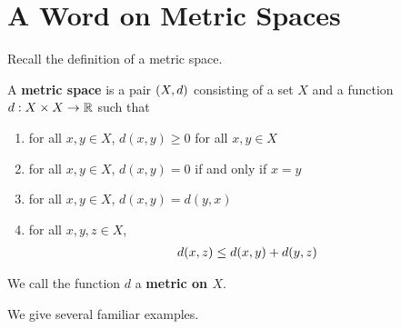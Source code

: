 \section{A Word on Metric Spaces}

Recall the definition of a metric space.

\begin{boxdefinition}
    A \textbf{metric space} is a pair $\left( X, d \right)$ consisting of a set $X$ and a function $d : X \times X \to \mathbb{R}$ such that
    \begin{enumerate}
        \item for all $x, y \in X$, $d(x, y) \geq 0$ for all $x, y \in X$
        \item for all $x, y \in X$, $d(x, y) = 0$ if and only if $x = y$
        \item for all $x, y \in X$, $d(x, y) = d(y, x)$
        \item for all $x, y, z \in X$,
        \begin{align*}
            d\!\left( x, z \right) \leq d\!\left( x, y \right) + d\!\left( y, z \right)
        \end{align*}
    \end{enumerate}
    We call the function $d$ a \textbf{metric on $X$}.
\end{boxdefinition}

We give several familiar examples.


